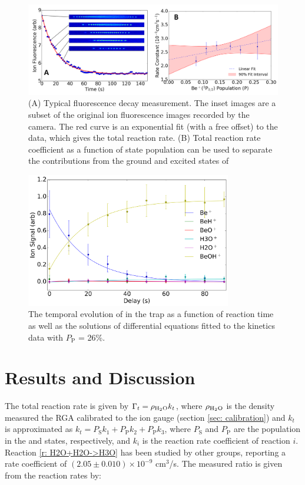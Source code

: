 \begin{figure}
	\centering
	\includegraphics[width=\textwidth]{images/Be_H2O_fit.png}
	\caption{(A) Typical fluorescence decay measurement. The inset images are a subset of the original ion fluorescence images recorded by the camera. The red curve is an exponential fit (with a free offset) to the data, which gives the total reaction rate. (B) Total reaction rate coefficient as a function of  state population can be used to separate the contributions from the ground and excited states of }
	\label{fig: Be+H2O fit}
\end{figure}

\begin{figure}
	\centering
	\includegraphics[width=0.8\textwidth]{images/Be_H2O_sf.png}
	\caption{The temporal evolution of 	in the trap as a function of reaction time as well as the solutions of differential equations fitted to the kinetics data with $P_{\text{P}}$ = 26\%.}
	\label{fig: Be+H2O shared fit}
\end{figure}


\section{Results and Discussion}

The total reaction rate is given by $\Gamma_t = \rho_{\ce{H2O}} k_t$, where $\rho_{\ce{H2O}}$ is the  density measured the RGA calibrated to the ion gauge (section \ref{sec: calibration}) and $k_t$ is approximated as $k_t = P_\text{S} k_1 + P_\text{P} k_2 + P_\text{P} k_3$, where $P_\text{S}$ and $P_\text{P}$ are the  population in the  and  states, respectively, and $k_i$ is the reaction rate coefficient of reaction $i$. Reaction \cref{r: H2O+H2O->H3O} has been studied by other groups, reporting a rate coefficient of $(2.05 \pm 0.010) \times 10^{-9}$ cm$^3$/s.\cite{Huntress2004} The measured  ratio is given from the reaction rates by:

